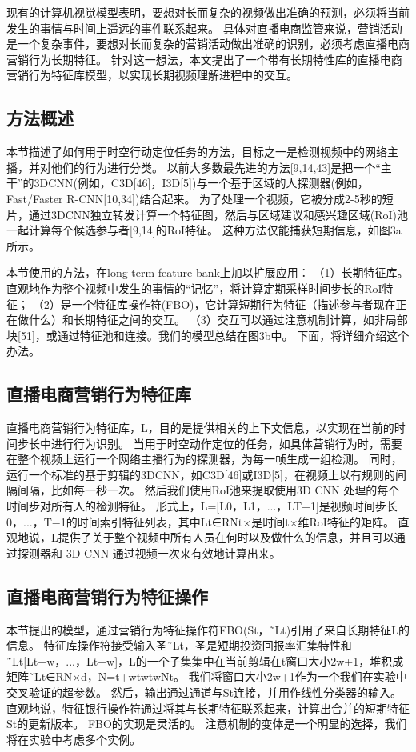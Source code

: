 现有的计算机视觉模型表明，要想对长而复杂的视频做出准确的预测，必须将当前发生的事情与时间上遥远的事件联系起来。
具体对直播电商监管来说，营销活动是一个复杂事件，要想对长而复杂的营销活动做出准确的识别，必须考虑直播电商营销行为长期特征。
针对这一想法，本文提出了一个带有长期特性库的直播电商营销行为特征库模型，以实现长期视频理解进程中的交互。

\subsection{方法概述}
本节描述了如何用于时空行动定位任务的方法，目标之一是检测视频中的网络主播，并对他们的行为进行分类。
以前大多数最先进的方法[9,14,43]是把一个“主干”的3DCNN(例如，C3D[46]，I3D[5])与一个基于区域的人探测器(例如，Fast/Faster R-CNN[10,34])结合起来。
为了处理一个视频，它被分成2-5秒的短片，通过3DCNN独立转发计算一个特征图，然后与区域建议和感兴趣区域(RoI)池一起计算每个候选参与者[9,14]的RoI特征。
这种方法仅能捕获短期信息，如图3a所示。

本节使用的方法，在long-term feature bank上加以扩展应用：
（1）长期特征库。直观地作为整个视频中发生的事情的“记忆”，将计算定期采样时间步长的RoI特征；
（2）是一个特征库操作符(FBO)，它计算短期行为特征（描述参与者现在正在做什么）和长期特征之间的交互。
（3）交互可以通过注意机制计算，如非局部块[51]，或通过特征池和连接。我们的模型总结在图3b中。
下面，将详细介绍这个办法。

\subsection{直播电商营销行为特征库}
直播电商营销行为特征库，L，目的是提供相关的上下文信息，以实现在当前的时间步长中进行行为识别。
当用于时空动作定位的任务，如具体营销行为时，需要在整个视频上运行一个网络主播行为的探测器，为每一帧生成一组检测。
同时，运行一个标准的基于剪辑的3DCNN，如C3D[46]或I3D[5]，在视频上以有规则的间隔间隔，比如每一秒一次。
然后我们使用RoI池来提取使用3D CNN 处理的每个时间步对所有人的检测特征。
形式上，L=[L0，L1，...，LT−1]是视频时间步长0，...，T−1的时间索引特征列表，其中Lt∈RNt×是时间t×维RoI特征的矩阵。
直观地说，L提供了关于整个视频中所有人员在何时以及做什么的信息，并且可以通过探测器和 3D CNN 通过视频一次来有效地计算出来。

\subsection{直播电商营销行为特征操作}

本节提出的模型，通过营销行为特征操作符FBO(St，˜Lt)引用了来自长期特征L的信息。
特征库操作符接受输入圣˜Lt，圣是短期投资回报率汇集特性和˜Lt[Lt−w，...，Lt+w]，L的一个子集集中在当前剪辑在t窗口大小2w+1，堆积成矩阵˜Lt∈RN×d，N=t+wtwtwNt。
我们将窗口大小2w+1作为一个我们在实验中交叉验证的超参数。
然后，输出通过通道与St连接，并用作线性分类器的输入。
直观地说，特征银行操作符通过将其与长期特征联系起来，计算出合并的短期特征St的更新版本。
FBO的实现是灵活的。
注意机制的变体是一个明显的选择，我们将在实验中考虑多个实例。

